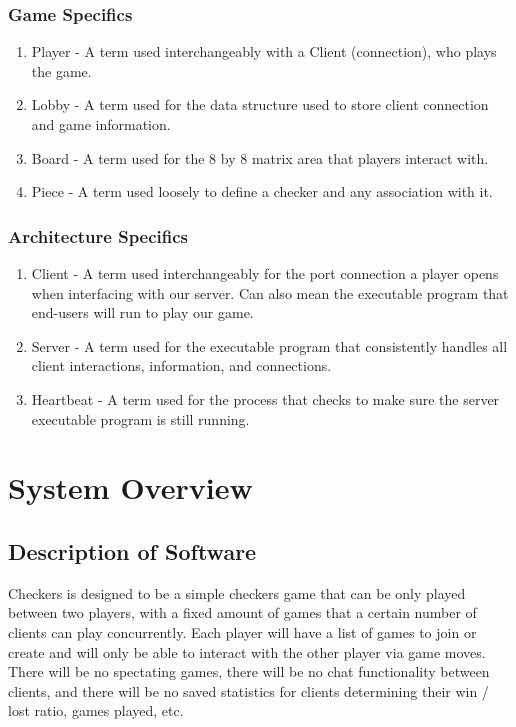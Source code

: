 \documentclass{scrreprt}
\begin{document}
		\subsection {Game Specifics}
			\begin{enumerate}
			\item Player - A term used interchangeably with a Client (connection), who plays the game.
			\item Lobby - A term used for the data structure used to store client connection and game information.
			\item Board - A term used for the 8 by 8 matrix area that players interact with.
			\item Piece - A term used loosely to define a checker and any association with it.
			\end{enumerate}

		\subsection {Architecture Specifics}
			\begin{enumerate}
			\item Client - A term used interchangeably for the port connection a player opens when interfacing with our server. Can also mean the executable program that end-users will run to play our game.
			\item Server - A term used for the executable program that consistently handles all client interactions, information, and connections.
			\item Heartbeat - A term used for the process that checks to make sure the server executable program is still running.
			\end{enumerate}
		
\chapter{System Overview}
	\section{Description of Software}
	Checkers is designed to be a simple checkers game that can be only played between two players, with a fixed amount of games that a certain number of clients can play concurrently. Each player will have a list of games to join or create and will only be able to interact with the other player via game moves. There will be no spectating games, there will be no chat functionality between clients, and there will be no saved statistics for clients determining their win / lost ratio, games played, etc.
\end{document}
